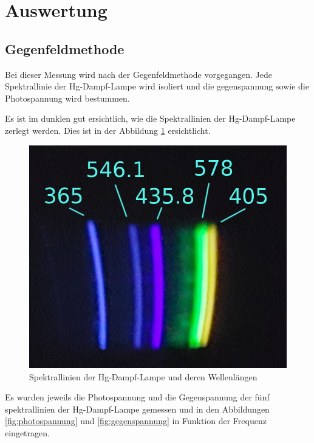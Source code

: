 \section{Auswertung}

\subsection{Gegenfeldmethode}

Bei   dieser   Messung  wird  nach  der  Gegenfeldmethode  vorgegangen.   Jede
Spektrallinie der Hg-Dampf-Lampe wird isoliert und die gegenspannung sowie die
Photospannung wird bestummen.

Es ist im dunklen gut ersichtlich, wie  die  Spektrallinien der Hg-Dampf-Lampe
zerlegt  werden.  Dies   ist   in   der   Abbildung   \ref{fig:spektrallinien}
ersichtlicht.

\begin{figure}[H]
    \centering
    \includegraphics[width=.4\linewidth]{images/hg-spektrallinien.png}
    \caption{Spektrallinien der Hg-Dampf-Lampe und deren Wellenl\"angen}
    \label{fig:spektrallinien}
\end{figure}

Es  wurden  jeweils   die  Photospannung  und  die  Gegenspannung  der  f\"unf
spektrallinien   der   Hg-Dampf-Lampe   gemessen   und   in  den   Abbildungen
\ref{fig:photospannung}  und  \ref{fig:gegenspannung} in Funktion der Frequenz
eingetragen.

